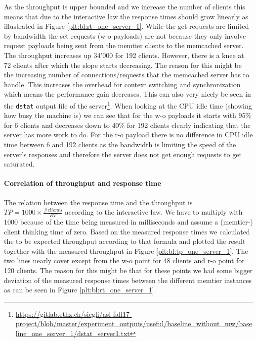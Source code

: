 \documentclass[11pt,a4paper]{article}
\let\tt\texttt
\begin{document}
As the throughput is upper bounded and we increase the number of clients this means that due to the interactive law the response times should grow linearly as illustrated in Figure \ref{plt:bl:rt_one_server_1}. While the get requests are limited by bandwidth the set requests (w-o payloads) are not because they only involve request payloads being sent from the memtier clients to the memcached server. The throughput increases up 34'000 for 192 clients. However, there is a knee at 72 clients after which the slope starts decreasing. The reason for this might be the increasing number of connections/requests that the memcached server has to handle. This increases the overhead for context switching and synchronization which means the performance gain decreases. This can also very nicely be seen in the \tt{dstat} output file of the server\footnote{\url{https://gitlab.ethz.ch/siegli/asl-fall17-project/blob/master/experiment_outputs/useful/baseline_without_mw/baseline_one_server_1/dstat_server1.txt}}. When looking at the CPU idle time (showing how busy the machine is) we can see that for the w-o payloads it starts with 95\% for 6 clients and decreases down to 40\% for 192 clients clearly indicating that the server has more work to do. For the r-o payload there is no difference in CPU idle time between 6 and 192 clients as the bandwidth is limiting the speed of the server's responses and therefore the server does not get enough requests to get saturated. 


\paragraph{Correlation of throughput and response time}
The relation between the response time and the throughput is $TP = 1000 \times \frac{\#clients}{RT}$ according to the interactive law. We have to multiply with 1000 because of the time being measured in milliseconds and assume a (memtier-) client thinking time of zero. Based on the measured response times we calculated the to be expected throughput according to that formula and plotted the result together with the measured throughput in Figure \ref{plt:bl:tp_one_server_1}. The two lines nearly cover except from the w-o point for 48 clients and r-o point for 120 clients. The reason for this might be that for these points we had some bigger deviation of the measured response times between the different memtier instances as can be seen in Figure \ref{plt:bl:rt_one_server_1}.
\end{document}
